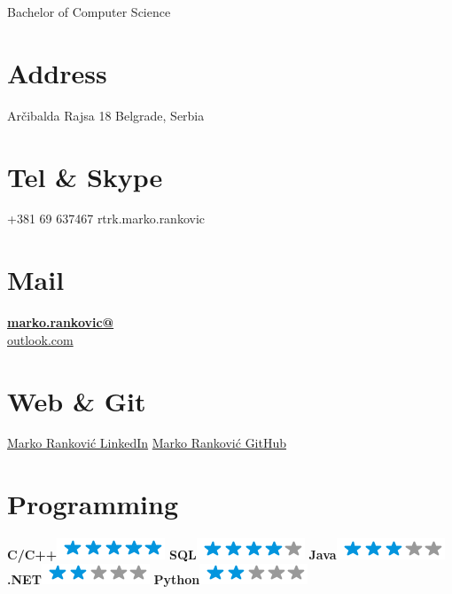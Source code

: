 \documentclass[]{rankovic-cv}
\begin{document}
      {Bachelor of Computer Science}
      



\begin{aside}
  \section{Address}
    Arčibalda Rajsa 18
    Belgrade, Serbia
    ~
  \section{Tel \& Skype}
    +381 69 637467
    rtrk.marko.rankovic
    ~
  \section{Mail}
    \href{mailto:marko.rankovic@outlook.com}{\textbf{marko.rankovic@}\\outlook.com}
    ~
  \section{Web \& Git}
    \href{https://www.linkedin.com/in/marko-rankovic-055034b0}{Marko Ranković LinkedIn}
    \href{https://github.com/marko-rankovic}{Marko Ranković GitHub}
    ~
  \section{Programming}
    \textbf{C/C++}\includegraphics[scale=0.40]{img/5stars.png}
    \textbf{SQL}\includegraphics[scale=0.40]{img/4stars.png}
    \textbf{Java}\includegraphics[scale=0.40]{img/3stars.png}
    \textbf{.NET}\includegraphics[scale=0.40]{img/2stars.png}
    \textbf{Python}\includegraphics[scale=0.40]{img/2stars.png}
    ~

\end{aside}
\end{document}

